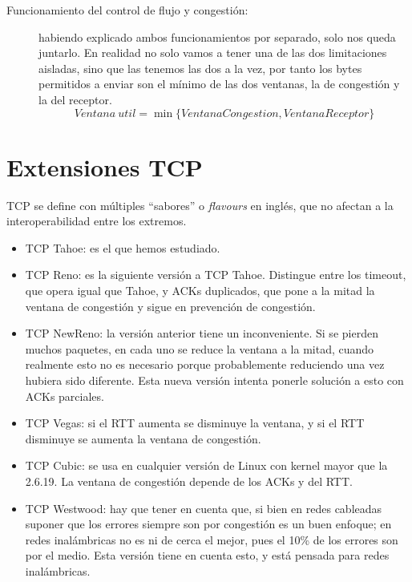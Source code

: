 \begin{description}
    \item [Funcionamiento del control de flujo y congestión:] habiendo explicado ambos funcionamientos por separado, solo nos queda juntarlo. En realidad no solo vamos a tener una de las dos limitaciones aisladas, sino que las tenemos las dos a la vez, por tanto los bytes permitidos a enviar son el mínimo de las dos ventanas, la de congestión y la del receptor.
        \begin{equation*}
            Ventana \ util = \min\{VentanaCongestion, VentanaReceptor\}
        \end{equation*}
\end{description}

\section{Extensiones TCP}
TCP se define con múltiples ``sabores'' o \textit{flavours} en inglés, que no afectan a la interoperabilidad entre los extremos. 
\begin{itemize}
    \item TCP Tahoe: es el que hemos estudiado.
    \item TCP Reno: es la siguiente versión a TCP Tahoe. Distingue entre los timeout, que opera igual que Tahoe, y ACKs duplicados, que pone a la mitad la ventana de congestión y sigue en prevención de congestión. 
    \item TCP NewReno: la versión anterior tiene un inconveniente. Si se pierden muchos paquetes, en cada uno se reduce la ventana a la mitad, cuando realmente esto no es necesario porque probablemente reduciendo una vez hubiera sido diferente. Esta nueva versión intenta ponerle solución a esto con ACKs parciales. 
    \item TCP Vegas: si el \acrshort{RTT} aumenta se disminuye la ventana, y si el \acrshort{RTT} disminuye se aumenta la ventana de congestión.
    \item TCP Cubic: se usa en cualquier versión de Linux con kernel mayor que la 2.6.19. La ventana de congestión depende de los ACKs y del \acrshort{RTT}. 
    \item TCP Westwood: hay que tener en cuenta que, si bien en redes cableadas suponer que los errores siempre son por congestión es un buen enfoque; en redes inalámbricas no es ni de cerca el mejor, pues el 10\% de los errores son por el medio. Esta versión tiene en cuenta esto, y está pensada para redes inalámbricas.
\end{itemize}

